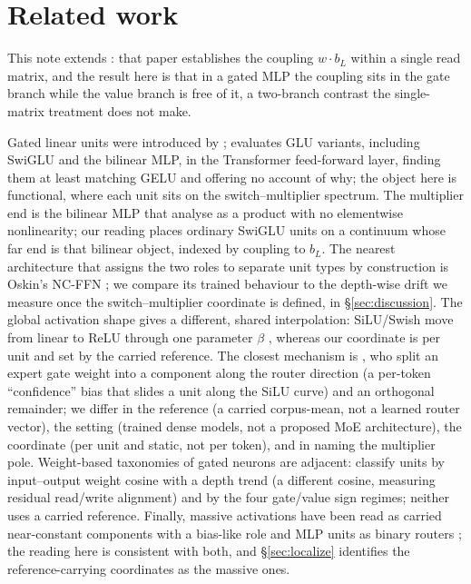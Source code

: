 \documentclass[11pt]{article}
\newcommand{\bl}{b_L}
\begin{document}
\section{Related work}
\label{sec:related}

This note extends \citet{tuomi2026background}: that paper establishes the
coupling $w\cdot\bl$ within a single read matrix, and the result here is that in a
gated MLP the coupling sits in the gate branch while the value branch is free of
it, a two-branch contrast the single-matrix treatment does not make.

Gated linear units were introduced by \citet{dauphin2017}; \citet{shazeer2020}
evaluates GLU variants, including SwiGLU and the bilinear MLP, in the
Transformer feed-forward layer, finding them at least matching GELU and
offering no account of why; the
object here is functional, where each unit sits on the switch--multiplier
spectrum. The multiplier end is the bilinear MLP that \citet{pearce2024} analyse
as a product with no elementwise nonlinearity; our reading places ordinary SwiGLU
units on a continuum whose far end is that bilinear object, indexed by coupling to
$\bl$. The nearest architecture that assigns the two roles to separate unit types
by construction is Oskin's NC-FFN \citep{oskin2026}; we compare its trained
behaviour to the depth-wise drift we measure once the switch--multiplier
coordinate is defined, in \S\ref{sec:discussion}. The global activation shape
gives a different, shared interpolation:
SiLU/Swish move from linear to ReLU through one parameter $\beta$
\citep{ramachandran2017swish}, whereas our coordinate is per unit and set by the
carried reference. The closest mechanism is \citet{li2026confadaptive}, who split
an expert gate weight into a component along the router direction (a per-token
``confidence'' bias that slides a unit along the SiLU curve) and an orthogonal
remainder; we differ in the reference (a carried corpus-mean, not a learned router
vector), the setting (trained dense models, not a proposed MoE architecture), the
coordinate (per unit and static, not per token), and in naming the multiplier
pole. Weight-based taxonomies of gated neurons are adjacent: \citet{gerstner2025}
classify units by input--output weight cosine with a depth trend (a different
cosine, measuring residual read/write alignment) and \citet{gluscope2026} by the
four gate/value sign regimes; neither uses a carried reference. Finally, massive
activations have been read as carried near-constant components with a bias-like
role \citep{sun2024} and MLP units as binary routers \citep{balogh2026}; the
reading here is consistent with both, and \S\ref{sec:localize} identifies the
reference-carrying coordinates as the massive ones.
\end{document}
